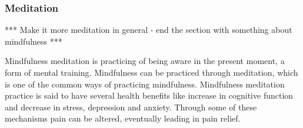 \subsubsection{Meditation}
*** Make it more meditation in general - end the section with something about mindfulness *** 

Mindfulness meditation is practicing of being aware in the present moment, a form of mental training. Mindfulness can be practiced through meditation, which is one of the common ways of practicing mindfulness. Mindfulness meditation practice is said to have several health benefits like increase in cognitive function and decrease in stress, depression and anxiety. Through some of these mechanisms pain can be altered, eventually leading in pain relief. \cite{Zeidan2016} 
